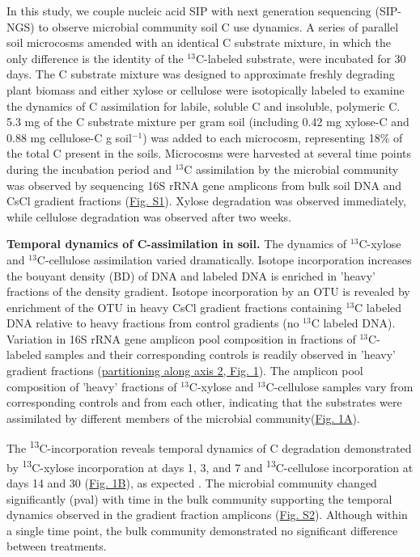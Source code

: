 In this study, we couple nucleic acid SIP with next generation sequencing (SIP-NGS) to observe microbial community soil C use dynamics. A series of parallel soil microcosms amended with an identical C substrate mixture, in which the only difference is the identity of the $^{13}$C-labeled substrate, were incubated for 30 days. The C substrate mixture was designed to approximate freshly degrading plant biomass and either xylose or cellulose were isotopically labeled to examine the dynamics of C assimilation for labile, soluble C and insoluble, polymeric C. 5.3 mg of the C substrate mixture per gram soil (including 0.42 mg xylose-C and 0.88 mg cellulose-C g soil$^{-1}$) was added to each microcosm, representing 18\% of the total C present in the soils. Microcosms were harvested at several time points during the incubation period and $^{13}$C assimilation by the microbial community was observed by sequencing 16S rRNA gene amplicons from bulk soil DNA and CsCl gradient fractions (\href{https://www.authorea.com/users/3537/articles/8459/master/file/figures/20140708_ConceptualFig2/20140708_ConceptualFig2.pdf}{Fig. S1}). Xylose degradation was observed immediately, while cellulose degradation was observed after two weeks.

\textbf{Temporal dynamics of C-assimilation in soil.}  
The dynamics of $^{13}$C-xylose and $^{13}$C-cellulose assimilation varied dramatically. Isotope incorporation increases the bouyant density (BD) of DNA and labeled DNA is enriched in 'heavy' fractions of the density gradient. Isotope incorporation by an OTU is revealed by enrichment of the OTU in heavy CsCl gradient fractions containing $^{13}$C labeled DNA relative to heavy fractions from control gradients (no $^{13}$C labeled DNA). Variation in 16S rRNA gene amplicon pool composition in fractions of $^{13}$C-labeled samples and their corresponding controls is readily observed in 'heavy' gradient fractions (\href{https://www.authorea.com/users/3537/articles/3612/master/file/figures/ordination_all1/ordination_all1.png}{partitioning along axis 2, Fig. 1}). The amplicon pool composition of 'heavy' fractions of $^{13}$C-xylose and $^{13}$C-cellulose samples vary from corresponding controls and from each other, indicating that the substrates were assimilated by different members of the  microbial community(\href{https://www.authorea.com/users/3537/articles/3612/master/file/figures/ordination_all1/ordination_all1.png}{Fig. 1A}).

The \textsuperscript{13}C-incorporation reveals temporal dynamics of C degradation demonstrated by \textsuperscript{13}C-xylose incorporation at days 1, 3, and 7 and \textsuperscript{13}C-cellulose incorporation at days 14 and 30 (\href{https://www.authorea.com/users/3537/articles/3612/master/file/figures/ordination_all1/ordination_all1.png}{Fig. 1B}), as expected \cite{Amelung_2008}. The microbial community changed significantly (pval) with time in the bulk community supporting the temporal dynamics observed in the gradient fraction amplicons (\href{https://authorea.com/users/3537/articles/8459/master/file/figures/bulk_ordination/bulk_ordination.png}{Fig. S2}). Although within a single time point, the bulk community demonstrated no significant difference between treatments. 

